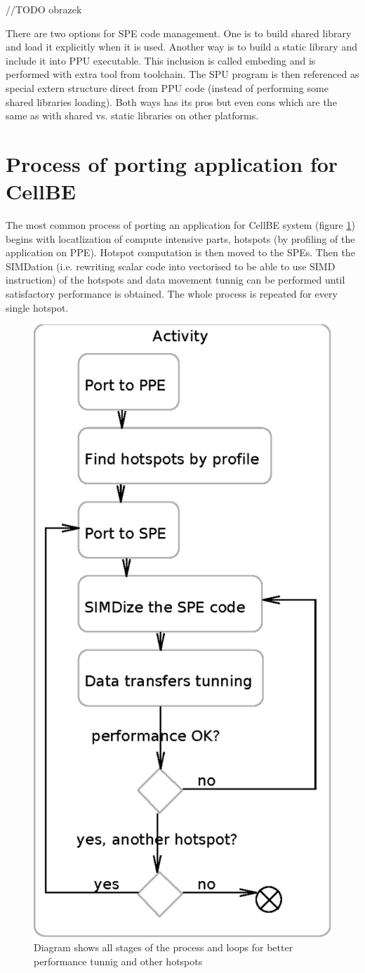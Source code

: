 //TODO obrazek

\par
There are two options for SPE code management.
 One is to build shared library and load it explicitly when it is used.
 Another way is to build a static library and include it into PPU executable.
 This inclusion is called embeding and is performed with extra tool from toolchain.
The SPU program is then referenced as special extern structure direct from PPU code (instead of performing some shared libraries loading).
 Both ways has its pros but even cons which are the same as with shared vs. static libraries on other platforms.


\section {Process of porting application for CellBE}

\par
The most common process of porting an application for CellBE system (figure \ref{fg:appPorting}) begins with locatlization of compute intensive parts, hotspots (by profiling of the application on PPE).
 Hotspot computation is then moved to the SPEs.
 Then the SIMDation (i.e. rewriting scalar code into vectorised to be able to use SIMD instruction) of the hotspots and data movement tunnig can be performed until satisfactory performance is obtained.
 The whole process is repeated for every single hotspot.

\begin{figure}
    \centering
    \includegraphics[height=\textwidth]{data/portingCycle}
    \caption[Application for CellBE porting process]{Diagram shows all stages of the process and loops for better performance tunnig and other hotspots}
    \label{fg:appPorting}
\end{figure}
